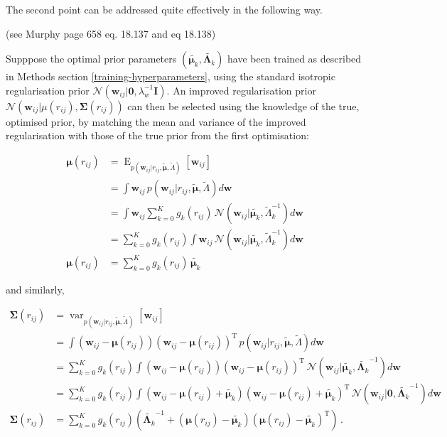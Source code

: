 \documentclass[12pt,a4paper,twoside]{book}
\newcommand{\Gauss}{\mathcal{N}}
\newcommand{\I}{\mathbf{I}}
\newcommand{\Lk}{\mathbf{\Lambda}_k}
\newcommand{\muk}{\mathbf{\mu}_k}
\newcommand{\rij}{r_{ij}}
\newcommand{\w}{\mathbf{w}}
\newcommand{\wij}{\mathbf{w}_{ij}}
\theoremstyle{definition}
\theoremstyle{definition}
\theoremstyle{remark}
\begin{document}
The second point can be addressed quite effectively in the following
way.

(see Murphy page 658 eq. 18.137 and eq 18.138)

Supppose the optimal prior parameters \((\tilde{\muk}, \tilde{\Lk})\)
have been trained as described in Methods section
\ref{training-hyperparameters}, using the standard isotropic
regularisation prior
\(\Gauss(\w_{ij} | \mathbf{0}, \lambda_w^{-1} \I)\). An improved
regularisation prior
\(\Gauss( \wij | \mu(r_{ij}), \mathbf{\Sigma}(r_{ij}))\) can then be
selected using the knowledge of the true, optimised prior, by matching
the mean and variance of the improved regularisation with those of the
true prior from the first optimisation:

\begin{align} 
    \mathbf{\mu}(r_{ij}) &= \operatorname{E}_{p( \wij | \rij, \tilde{\mathbf{\mu}}, \tilde{\Lambda})} \left[  \wij \right]  \\
    &= \int \wij \, p( \wij | \rij, \tilde{\mathbf{\mu}}, \tilde{\Lambda}) d \w  \\
    &= \int \wij \sum_{k=0}^K g_k(\rij) \, \Gauss(\wij | \tilde{\muk}, \tilde{\Lambda}_k^{-1})  d \w \\
    &= \sum_{k=0}^K g_k(\rij) \int \wij  \, \Gauss(\wij | \tilde{\muk}, \tilde{\Lambda}_k^{-1})  d \w  \\
    \mathbf{\mu}(r_{ij}) &= \sum_{k=0}^K g_k(\rij) \, \tilde{\muk}
\end{align}

and similarly,

\begin{align}
    \mathbf{\Sigma}(r_{ij}) &= \operatorname{var}_{ p(\wij | \rij, \tilde{\mathbf{\mu}}, \tilde{\Lambda} )}  \left[ \wij \right] \\
    &= \int (\wij - \mathbf{\mu}(r_{ij})) (\wij - \mathbf{\mu}(r_{ij}))^\mathrm{T} \, p( \wij | \rij, \tilde{\mathbf{\mu}}, \tilde{\Lambda}) d \w \\
    &= \sum_{k=0}^K g_k(\rij) \int  (\wij - \mathbf{\mu}(r_{ij})) (\wij - \mathbf{\mu}(r_{ij}))^\mathrm{T} \, \Gauss(\wij | \tilde{\muk}, \tilde{\Lk}^{-1}) d \w \\
    &= \sum_{k=0}^K g_k(\rij) \int  (\wij - \mathbf{\mu}(r_{ij}) + \tilde{\muk}) (\wij - \mathbf{\mu}(r_{ij}) + \tilde{\muk})^\mathrm{T} \, \Gauss(\wij | \mathbf{0} , \tilde{\Lk}^{-1}) d \w \\
    \mathbf{\Sigma}(r_{ij}) &= \sum_{k=0}^K g_k(\rij) \left( \tilde{\Lk}^{-1} + (\mathbf{\mu}(r_{ij}) - \tilde{\muk}) (\mathbf{\mu}(r_{ij}) - \tilde{\muk})^\mathrm{T}\right) \,. 
\end{align}
\end{document}
